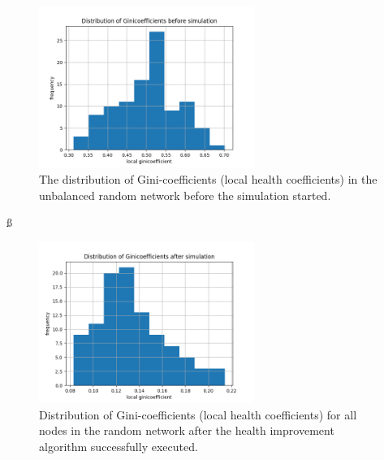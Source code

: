 \documentclass[a4paper]{paper}
\begin{document}
\begin{figure}
 \centering
 \includegraphics[width=7cm]{code/results/routabilityTest/1574847007_ginicoefficients_start.png}
 \caption{The distribution of Gini-coefficients (local health coefficients) in the unbalanced random network before the simulation started.}
 \label{fig:giniStart}
\end{figure}ß
\begin{figure}
 \centering
 \includegraphics[width=7cm]{code/results/routabilityTest/1574847007_ginicoefficients_end.png}
 \caption{Distribution of Gini-coefficients (local health coefficients) for all nodes in the random network after the health improvement algorithm successfully executed.}
 \label{fig:giniEnd}
\end{figure}




\end{document}
